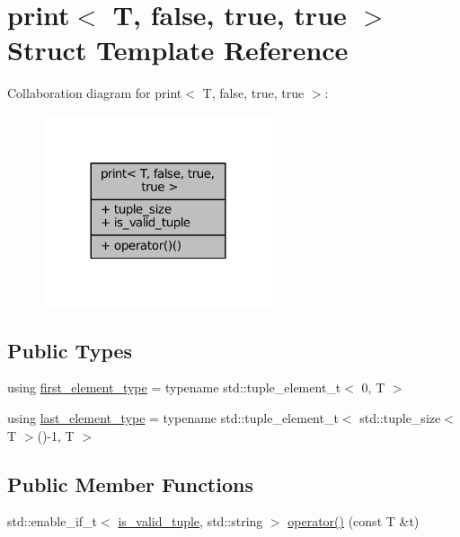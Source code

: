 \hypertarget{structprint_3_01T_00_01false_00_01true_00_01true_01_4}{}\section{print$<$ T, false, true, true $>$ Struct Template Reference}
\label{structprint_3_01T_00_01false_00_01true_00_01true_01_4}


Collaboration diagram for print$<$ T, false, true, true $>$\+:
\nopagebreak
\begin{figure}[H]
\begin{center}
\leavevmode
\includegraphics[width=192pt]{structprint_3_01T_00_01false_00_01true_00_01true_01_4__coll__graph}
\end{center}
\end{figure}
\subsection*{Public Types}
\begin{DoxyCompactItemize}
\item 
using \hyperlink{structprint_3_01T_00_01false_00_01true_00_01true_01_4_a2dae0d9d3db0a28ae73051bef2394aaa}{first\+\_\+element\+\_\+type} = typename std\+::tuple\+\_\+element\+\_\+t$<$ 0, T $>$
\item 
using \hyperlink{structprint_3_01T_00_01false_00_01true_00_01true_01_4_a7409ff0e8e3242c751eaec334842ae4a}{last\+\_\+element\+\_\+type} = typename std\+::tuple\+\_\+element\+\_\+t$<$ std\+::tuple\+\_\+size$<$ T $>$()-\/1, T $>$
\end{DoxyCompactItemize}
\subsection*{Public Member Functions}
\begin{DoxyCompactItemize}
\item 
std\+::enable\+\_\+if\+\_\+t$<$ \hyperlink{structprint_3_01T_00_01false_00_01true_00_01true_01_4_ac26cb1e1f2d4e622fc9bd7ba97555dc4}{is\+\_\+valid\+\_\+tuple}, std\+::string $>$ \hyperlink{structprint_3_01T_00_01false_00_01true_00_01true_01_4_a6be8db822c3eb9a125d9f45eef7853a9}{operator()} (const T \&t)
\end{DoxyCompactItemize}
